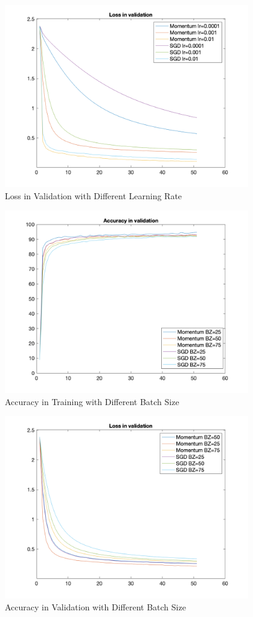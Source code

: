 \documentclass{article}
\begin{document}
\begin{figure}[!h]
  \centering
  \includegraphics[height=8cm]{plots/lv_lr.png}
  \caption{Loss in Validation with Different Learning Rate}
\end{figure}
\begin{figure}[!h]
  \centering
  \includegraphics[height=8cm]{plots/av_bz.png}
  \caption{Accuracy in Training with Different Batch Size}
\end{figure}
\begin{figure}[!h]
  \centering
  \includegraphics[height=8cm]{plots/lv_bz.png}
  \caption{Accuracy in Validation with Different Batch Size}
\end{figure}
\end{document}

